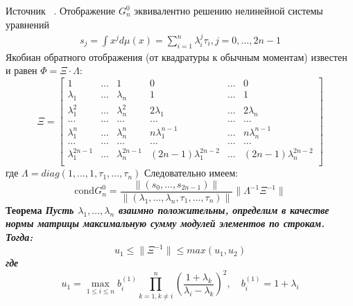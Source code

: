 Источник ~\cite{GautschiW5}. Отображение $G_n^{0}$ эквивалентно решению
нелинейной системы уравнений
\begin{eqnarray}
s_j=\int{x^jd\mu(x)}=\sum\limits_{i=1}^{n}{\lambda_i^j\tau_i}, j=0,\ldots,2n-1
\end{eqnarray}
Якобиан обратного отображения (от квадратуры к обычным моментам) известен
и равен $\Phi=\Xi\cdot\Lambda$:
\begin{equation}
\Xi=
\left[
\begin{array}{cccccccccc}
1 &  \ldots & 1 & 0  & \ldots & 0 \\
\lambda_1 & \ldots & \lambda_{n} & 1 & \ldots & 1 \\
\lambda^2_1 & \ldots & \lambda^2_{n} & 2\lambda_1 & \ldots & 2\lambda_n\\
\ldots & \ldots & \ldots & \ldots & \ldots & \ldots  \\
\lambda^n_1 & \ldots & \lambda^n_{n} & n\lambda^{n-1}_1 & \ldots & n\lambda^{n-1}_n\\
\ldots & \ldots & \ldots & \ldots & \ldots & \ldots  \\
\lambda^{2n-1}_1 & \ldots & \lambda^{2n-1}_{n} & (2n-1)\lambda^{2n-2}_1 & \ldots & (2n-1)\lambda^{2n-2}_{n}\\
\end{array}
\right]
\end{equation}
где $\Lambda=diag(1,\ldots,1,\tau_1,\ldots,\tau_n)$
Следовательно имеем:
\begin{equation}
\mbox{cond}G_n^{0}=\frac
{\parallel (s_0,\ldots,s_{2n-1}) \parallel}
{\parallel (\lambda_1,\ldots,\lambda_{n},\tau_{1},\ldots,\tau_{n})\parallel}
\parallel \Lambda^{-1}\Xi^{-1} \parallel
\end{equation}
\bf Теорема \rm
\it Пусть $\lambda_1,\ldots,\lambda_n$ взаимно положительны, определим
в качестве нормы матрицы максимальную сумму модулей элементов по строкам.
Тогда:
\begin{equation}
u_1\leq \parallel \Xi^{-1} \parallel \leq max(u_1,u_2)
\end{equation}
где
\begin{equation}
u_1=\max\limits_{1\leq i \leq n}b^{(1)}_i\prod\limits_{k=1,k\not=i}^{n}
\left(
\frac{1+\lambda_k}
{\lambda_i-\lambda_k}
\right)^2, \quad b_i^{(1)}=1+\lambda_i
\end{equation}

